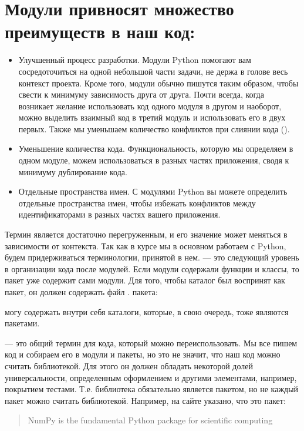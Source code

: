\documentclass[letterpaper,10pt,russian]{sphinxmanual}
\begin{document}
\section{Модули привносят множество преимуществ в наш код:}
\label{\detokenize{educational_materials/terms/content:id2}}\begin{itemize}
\item {} 
\sphinxAtStartPar
Улучшенный процесс разработки. Модули Python помогают вам сосредоточиться на одной небольшой части задачи, не держа в голове весь контекст проекта. Кроме того, модули обычно пишутся таким образом, чтобы свести к минимуму зависимость друга от друга. Почти всегда, когда возникает желание использовать код одного модуля в другом и наоборот, можно выделить взаимный код в третий модуль и использовать его в двух первых. Также мы уменьшаем количество конфликтов при слиянии кода ().

\item {} 
\sphinxAtStartPar
Уменьшение количества кода. Функциональность, которую мы определяем в одном модуле, можем использоваться в разных частях приложения, сводя к минимуму дублирование кода.

\item {} 
\sphinxAtStartPar
Отдельные пространства имен. С модулями Python вы можете определить отдельные пространства имен, чтобы избежать конфликтов между идентификаторами в разных частях вашего приложения.

\end{itemize}

\sphinxAtStartPar
Термин  является достаточно перегруженным, и его значение может меняться в зависимости от контекста. Так как в курсе мы в основном работаем с Python, будем придерживаться терминологии, принятой в нем.  — это следующий уровень в организации кода после модулей. Если модули содержали функции и классы, то пакет уже содержит сами модули. Для того, чтобы каталог был воспринят как пакет, он должен содержать файл .  пакета:

\sphinxAtStartPar
{}

\sphinxAtStartPar
{} могу содержать внутри себя каталоги, которые, в свою очередь, тоже являются пакетами.

\sphinxAtStartPar
{}  — это общий термин для кода, который можно переиспользовать. Мы все пишем код и собираем его в модули и пакеты, но это не значит, что наш код можно считать библиотекой. Для этого он должен обладать некоторой долей универсальности, определенным оформлением и другими элементами, например, покрытием тестами. Т.е. библиотека обязательно является пакетом, но не каждый пакет можно считать библиотекой. Например, на сайте  указано, что это пакет:
\begin{quote}

\sphinxAtStartPar
NumPy is the fundamental Python package for scientific computing
\end{quote}
\end{document}
